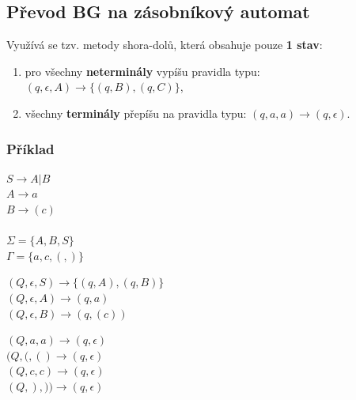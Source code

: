 \subsection{Převod BG na zásobníkový automat}
Využívá se tzv. metody shora-dolů, která obsahuje pouze \textbf{1 stav}:
\begin{enumerate}
\item pro všechny \textbf{neterminály} vypíšu pravidla typu: $(q, \epsilon, A) \rightarrow \{(q, B), (q, C)\}$,
\item všechny \textbf{terminály} přepíšu na pravidla typu: $(q, a, a) \rightarrow (q, \epsilon)$.
\end{enumerate}

\subsubsection*{Příklad}
\begin{minipage}[t]{0.3\textwidth}
$S \rightarrow A | B$\\
$A \rightarrow a$\\
$B \rightarrow (c)$\\\smallskip\\
$\Sigma = \{A, B, S\}$\\
$\Gamma = \{a, c, (, )\}$
\end{minipage}
\begin{minipage}[t]{0.4\textwidth}
$(Q, \epsilon, S) \rightarrow \{(q, A), (q, B)\}$\\
$(Q, \epsilon, A) \rightarrow (q, a)$\\
$(Q, \epsilon, B) \rightarrow (q, (c))$\\
\end{minipage}
\begin{minipage}[t]{0.3\textwidth}
$(Q, a, a) \rightarrow (q, \epsilon)$\\
$(Q, (, () \rightarrow (q, \epsilon)$\\
$(Q, c, c) \rightarrow (q, \epsilon)$\\
$(Q, ), )) \rightarrow (q, \epsilon)$\\
\end{minipage}
